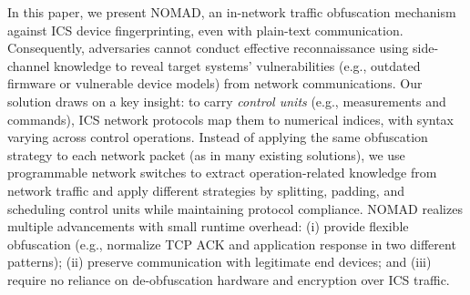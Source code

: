 
In this paper, we present NOMAD, an in-network traffic obfuscation mechanism against ICS device fingerprinting, even with plain-text communication. Consequently, adversaries cannot conduct effective reconnaissance using side-channel knowledge to reveal target systems' vulnerabilities (e.g., outdated firmware or vulnerable device models) from network communications. Our solution draws on a key insight: to carry \textit{control units} (e.g., measurements and commands), ICS network protocols map them to numerical indices, with syntax varying across control operations. %
Instead of applying the same obfuscation strategy to each network packet (as in many existing solutions), we use programmable network switches to extract operation-related knowledge from network traffic and apply different strategies by splitting, padding, and scheduling control units while maintaining protocol compliance. 
NOMAD realizes multiple advancements with small runtime overhead: (i) provide flexible obfuscation (e.g., normalize TCP ACK and application response in two different patterns); (ii) preserve communication with legitimate end devices; and (iii) require no reliance on de-obfuscation hardware and encryption over ICS traffic. 


